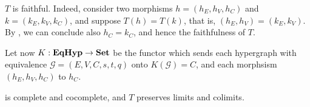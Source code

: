 \begin{remark}
	$T$ is faithful. Indeed, consider two morphisms $h = (h_E, h_V, h_C)$ and $k = (k_E, k_V, k_C)$, and suppose $T(h) = T(k)$, that is, $(h_E, h_V) = (k_E, k_V)$.
	By , we can conclude also $h_C = k_C$, and hence the faithfulness of $T$.
\end{remark}

Let now $K: \textbf{\textup{EqHyp}} \to \mathbf{Set}$ be the functor which sends each hypergraph with equivalence $\mathcal{G} = (E, V, C, s, t, q)$ onto $K(\mathcal{G}) = C$, and each morphsism $(h_E, h_V, h_C)$ to $h_C$.

\begin{proposition}
	\EqHyp is complete and cocomplete, and $T$ preserves limits and colimits.
\end{proposition}

